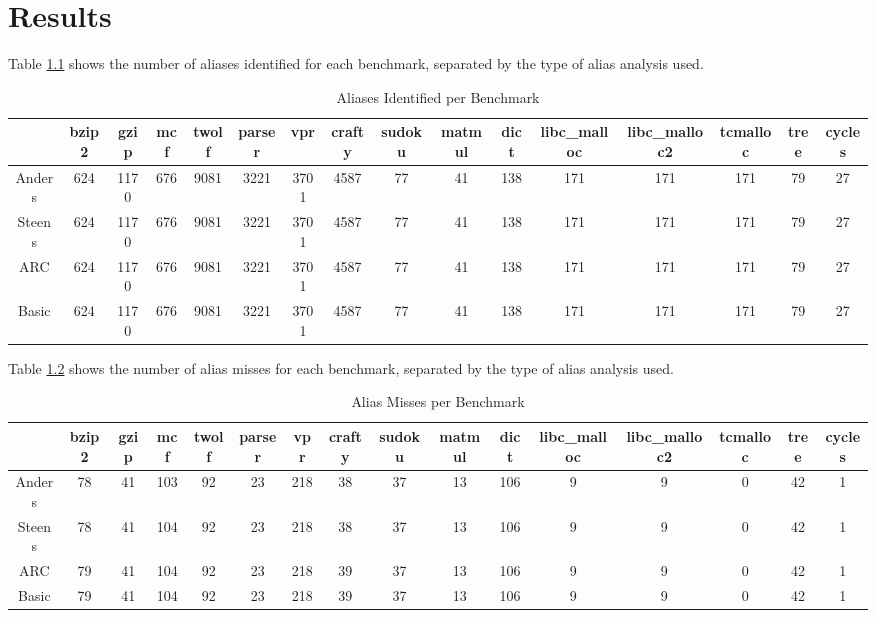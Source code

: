 \chapter{Results}

Table \ref{table:1} shows the number of aliases identified for each benchmark, separated by the type of alias analysis used.

\begin{table}
\centering
   \begin{tabular} {|c|c c c c c c c c c c c c c c c|}
      \hline
      & bzip2 & gzip & mcf & twolf & parser & vpr & crafty & sudoku & matmul & dict & libc_malloc & libc_malloc2 & tcmalloc & tree & cycles \\
      \hline
      Anders & 624 & 1170 & 676 & 9081 & 3221 & 3701 & 4587 & 77 & 41 & 138 & 171 & 171 & 171 & 79 & 27 \\
      \hline
      Steens & 624 & 1170 & 676 & 9081 & 3221 & 3701 & 4587 & 77 & 41 & 138 & 171 & 171 & 171 & 79 & 27 \\
      \hline
      ARC & 624 & 1170 & 676 & 9081 & 3221 & 3701 & 4587 & 77 & 41 & 138 & 171 & 171 & 171 & 79 & 27 \\
      \hline
      Basic & 624 & 1170 & 676 & 9081 & 3221 & 3701 & 4587 & 77 & 41 & 138 & 171 & 171 & 171 & 79 & 27 \\
      \hline
   \end{tabular}
   \caption{Aliases Identified per Benchmark}
   \label{table:1}
\end{table}

Table \ref{table:2} shows the number of alias misses for each benchmark, separated by the type of alias analysis used.

\begin{table}
\centering
   \begin{tabular} {|c|c c c c c c c c c c c c c c c|}
      \hline
      & bzip2 & gzip & mcf & twolf & parser & vpr & crafty & sudoku & matmul & dict & libc_malloc & libc_malloc2 & tcmalloc & tree & cycles \\
      \hline
      Anders & 78 & 41 & 103 & 92 & 23 & 218 & 38 & 37 & 13 & 106 & 9 & 9 & 0 & 42 & 1\\
      \hline
      Steens & 78 & 41 & 104 & 92 & 23 & 218 & 38 & 37 & 13 & 106 & 9 & 9 & 0 & 42 & 1\\
      \hline
      ARC & 79 & 41 & 104 & 92 & 23 & 218 & 39 & 37 & 13 & 106 & 9 & 9 & 0 & 42 & 1\\
      \hline
      Basic & 79 & 41 & 104 & 92 & 23 & 218 & 39 & 37 & 13 & 106 & 9 & 9 & 0 & 42 & 1\\
      \hline
   \end{tabular}
   \caption{Alias Misses per Benchmark}
   \label{table:2}
\end{table}

